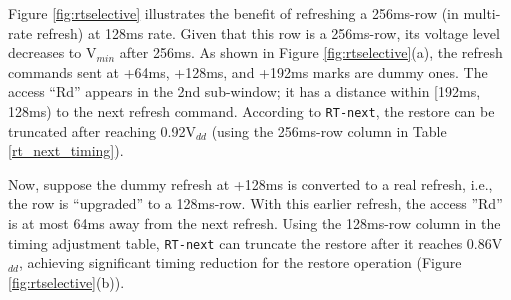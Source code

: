 Figure \ref{fig:rtselective} illustrates the benefit of refreshing a 256ms-row (in multi-rate refresh) at 128ms rate.  Given that this row is a 256ms-row, its voltage level decreases to V$_{min}$ after 256ms. As shown in Figure \ref{fig:rtselective}(a), the refresh commands sent at +64ms, +128ms, and +192ms marks are dummy ones. The access ``Rd'' appears in the 2nd sub-window; it has a distance within [192ms, 128ms) to the next refresh command. According to {\tt RT-next}, the restore can be truncated after reaching 0.92V$_{dd}$ (using the 256ms-row column in Table \ref{rt_next_timing}).

Now, suppose the dummy refresh at +128ms is converted to a real refresh, i.e.,  the row is ``upgraded'' to a 128ms-row.  With this earlier refresh, 
the access ''Rd'' is at most 64ms away from the next refresh. 
Using the 128ms-row column in the timing adjustment table, {\tt RT-next} 
can truncate the restore after it reaches 0.86V$_{dd}$, achieving significant timing 
reduction for the restore operation (Figure \ref{fig:rtselective}(b)).


